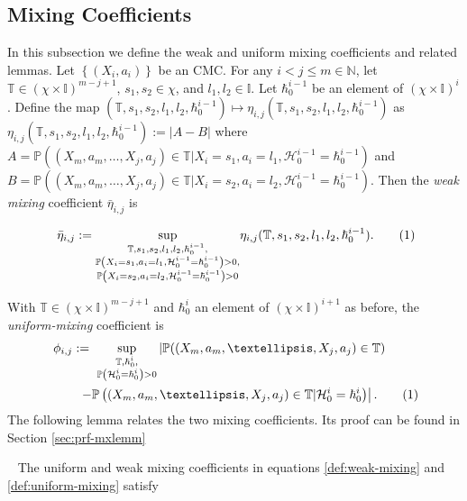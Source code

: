 \documentclass[opre,sglanonrev]{informs4}
\numberwithin{equation}{section}
\newcommand{\lp}{\left(}
\newcommand{\rp}{\right)}
\newcommand{\lc}{\left\{}
\newcommand{\rc}{\right\}}
\newcommand{\lv}{\left|}
\newcommand{\rv}{\right|}
\newcommand{\ldot}{\left.}
\newcommand{\rdot}{\right.}
\newcommand{\History}{\mathcal{H}}
\newcommand{\history}{\hbar}
\newcommand{\Ibb}{\mathbb{I}}
\newcommand{\Pbb}{\mathbb{P}}
\newcommand{\Tbb}{\mathbb{T}}
\newcommand\numberthis{\addtocounter{equation}{1}\tag{\theequation}}
\newcommand{\prob}{\Pbb}
\begin{document}
{{\subsection{Mixing Coefficients}
In this subsection we define the weak and uniform mixing coefficients and related lemmas. Let  $\lc (X_i,a_i)\rc$ be an CMC. 
%
For any $i < j \leq m \in \mathbb N$, let $\Tbb\in(\chi\times\Ibb)^{m-j+1}$, $s_1,s_2\in\chi$, and $l_1,l_2\in\Ibb$.
Let $\history_0^{i-1}$ be an element of $(\chi\times\Ibb)^{i}$. 
Define the map $(\mathbb{T},s_1,s_2,l_1,l_2,\history_0^{i-1}) \mapsto \eta_{i,j}(\mathbb{T},s_1,s_2,l_1,l_2,\history_0^{i-1})$ as $\eta_{i,j}(\mathbb{T},s_1,s_2,l_1,l_2,\history_0^{i-1}) :=|A-B|$ where
$A=\prob\left((X_m,a_m,\dots, X_j,a_j)\in \mathbb{T}|X_i=s_1,a_i=l_1,\History_0^{i-1}=\history_0^{i-1}\right)$ and $B=\prob\left((X_m,a_m,\dots,X_j,a_j)\in\mathbb{T}|X_i=s_2,a_i=l_2,\History_0^{i-1}=\history_0^{i-1}\right)$.
Then the \emph{weak mixing} coefficient $\bar\eta_{i,j}$ is 
\begin{small}
    \begin{align*}~\label{def:weak-mixing}
    \Bar{\eta}_{i,j}:= \underset{\color{black}\substack{\mathbb{T},s_1,s_2,l_1,l_2,\history_0^{i-1},\\\prob\lp X_i=s_1,a_i=l_1,\History_0^{i-1}=\history_0^{i-1}\rp>0,\\\prob\lp  X_i=s_2,a_i=l_2,\History_0^{i-1}=\history_0^{i-1}\rp>0}}{\sup} \eta_{i,j}(\mathbb{T},s_1,s_2,l_1,l_2,\history_0^{i-1}).\numberthis
\end{align*}
\end{small}
With $\Tbb\in(\chi\times\Ibb)^{m-j+1}$ and $\history_0^{i}$ an element of $(\chi\times\Ibb)^{i+1}$ as before, the \emph{uniform-mixing} coefficient is 
\begin{align*}~\label{def:uniform-mixing}
   & \phi_{i,j}:= \ \sup_{\substack{\Tbb,\history_0^i,\\ \prob\lp \History_0^{i}=\history_0^{i} \rp>0}} \lv \prob((X_m,a_m,\dots, X_j,a_j)\in \mathbb{T})\rdot\\&\qquad \ldot-\prob\lp(X_m,a_m,\dots, X_j,a_j)\in  \mathbb{T}|\History_0^{i}=\history_0^{i}\rp\rv .\numberthis
\end{align*}
The following lemma relates the two mixing coefficients. Its proof can be found in Section \ref{sec:prf-mxlemm}
\begin{lemma}~\label{lemma:mixing-lemm}
The uniform and weak mixing coefficients in equations \ref{def:weak-mixing} and \ref{def:uniform-mixing} satisfy 

\end{lemma}}}
\end{document}
